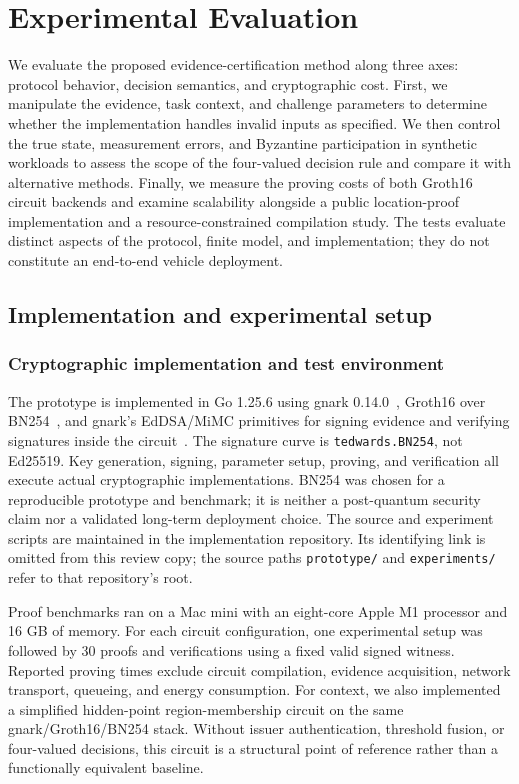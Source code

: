 \section{Experimental Evaluation}
We evaluate the proposed evidence-certification method along three axes: protocol behavior, decision semantics, and cryptographic cost. First, we manipulate the evidence, task context, and challenge parameters to determine whether the implementation handles invalid inputs as specified. We then control the true state, measurement errors, and Byzantine participation in synthetic workloads to assess the scope of the four-valued decision rule and compare it with alternative methods. Finally, we measure the proving costs of both Groth16 circuit backends and examine scalability alongside a public location-proof implementation and a resource-constrained compilation study. The tests evaluate distinct aspects of the protocol, finite model, and implementation; they do not constitute an end-to-end vehicle deployment.

\subsection{Implementation and experimental setup}
\subsubsection{Cryptographic implementation and test environment}
The prototype is implemented in Go 1.25.6 using gnark 0.14.0~\cite{gnark}, Groth16 over BN254~\cite{Groth2016}, and gnark's EdDSA/MiMC primitives for signing evidence and verifying signatures inside the circuit~\cite{MiMC2016}. The signature curve is \texttt{tedwards.BN254}, not Ed25519. Key generation, signing, parameter setup, proving, and verification all execute actual cryptographic implementations. BN254 was chosen for a reproducible prototype and benchmark; it is neither a post-quantum security claim nor a validated long-term deployment choice. The source and experiment scripts are maintained in the implementation repository. Its identifying link is omitted from this review copy; the source paths \texttt{prototype/} and \texttt{experiments/} refer to that repository's root.

Proof benchmarks ran on a Mac mini with an eight-core Apple M1 processor and 16 GB of memory. For each circuit configuration, one experimental setup was followed by 30 proofs and verifications using a fixed valid signed witness. Reported proving times exclude circuit compilation, evidence acquisition, network transport, queueing, and energy consumption. For context, we also implemented a simplified hidden-point region-membership circuit on the same gnark/Groth16/BN254 stack. Without issuer authentication, threshold fusion, or four-valued decisions, this circuit is a structural point of reference rather than a functionally equivalent baseline.

